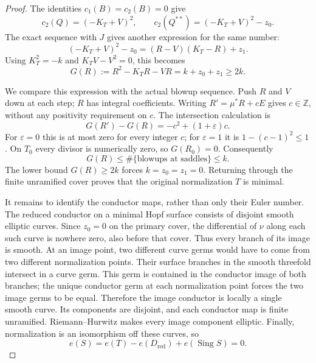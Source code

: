 \begin{proof}
The identities $c_1(B)=c_2(B)=0$ give
\[
 c_2(Q)=(-K_T+V)^2,\qquad
 c_2(Q^{**})=(-K_T+V)^2-z_0.
\]
The exact sequence with $J$ gives another
expression for the same number:
\[
 (-K_T+V)^2-z_0=(R-V)(K_T-R)+z_1.
\]
Using $K_T^2=-k$ and $K_TV-V^2=0$, this becomes
\[
 G(R):=R^2-K_TR-VR=k+z_0+z_1\ge2k.
\]

We compare this expression with the actual
blowup sequence. Push $R$ and $V$ down at
each step; $R$ has integral coefficients.
Writing $R'=\mu^*R+cE$ gives $c\in\mathbb Z$,
without any positivity requirement on $c$.
The intersection calculation is
\[
 G(R')-G(R)=-c^2+(1+\varepsilon)c.
\]
For $\varepsilon=0$ this is at most zero
for every integer $c$; for $\varepsilon=1$
it is $1-(c-1)^2\le1$. On $T_0$ every
divisor is numerically zero, so $G(R_0)=0$.
Consequently
\[
 G(R)\le\#\{\text{blowups at saddles}\}\le k.
\]
The lower bound $G(R)\ge2k$ forces
$k=z_0=z_1=0$. Returning through the finite
unramified cover proves that the original
normalization $T$ is minimal.

It remains to identify the conductor maps,
rather than only their Euler number.
The reduced conductor on a minimal Hopf
surface consists of disjoint smooth elliptic
curves. Since $z_0=0$ on the primary cover,
the differential of $\nu$ along each such
curve is nowhere zero, also before that
cover. Thus every branch of its image is
smooth. At an image point, two different
curve germs would have to come from two
different normalization points. Their
surface branches in the smooth threefold
intersect in a curve germ. This germ is
contained in the conductor image of both
branches; the unique conductor germ at
each normalization point forces the two
image germs to be equal. Therefore the
image conductor is locally a single smooth
curve. Its components are disjoint, and
each conductor map is finite unramified.
Riemann--Hurwitz makes every image component
elliptic. Finally, normalization is an
isomorphism off these curves, so
\[
 e(S)=e(T)-e(D_{\mathrm{red}})
                 +e(\operatorname{Sing}S)=0.
\]
\end{proof}
